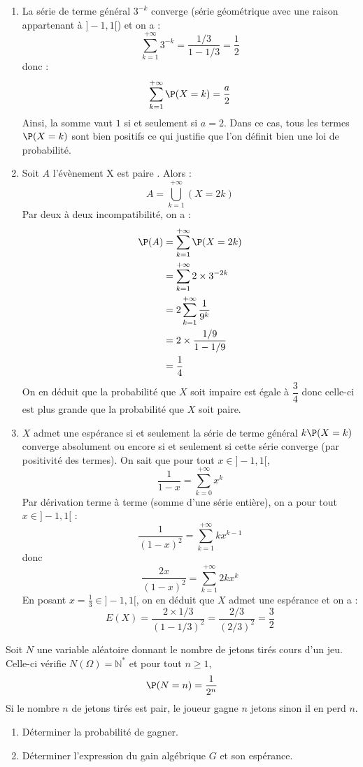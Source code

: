 \documentclass[a4paper,10pt]{report}
\begin{document}
\corr 

\begin{enumerate}
\item La série de terme général $3^{-k}$ converge (série géométrique avec une raison appartenant à $]-1,1[$) et on a :
$$ \sum_{k=1}^{+ \infty} 3^{-k} = \dfrac{1/3}{1-1/3}= \dfrac{1}{2}$$
donc :
$$ \sum_{k=1}^{+ \infty} \P(X=k) = \dfrac{a}{2}$$
Ainsi, la somme vaut $1$ si et seulement si $a=2$. Dans ce cas, tous les termes $\P(X=k)$ sont bien positifs ce qui justifie que l'on définit bien une loi de probabilité.
\item Soit $A$ l'évènement \og X est paire \fg. Alors :
$$ A = \bigcup_{k=1}^{+ \infty} (X=2k)$$
Par deux à deux incompatibilité, on a :
\begin{align*}
 \P(A) & = \sum_{k=1}^{+ \infty} \P(X=2k) \\
 & = \sum_{k=1}^{+ \infty} 2 \times 3^{-2k} \\
 & = 2 \sum_{k=1}^{+ \infty} \dfrac{1}{9^k} \\
 & = 2 \times \dfrac{1/9}{1-1/9} \\
 & = \dfrac{1}{4} 
 \end{align*}
On en déduit que la probabilité que $X$ soit impaire est égale à $\dfrac{3}{4}$ donc celle-ci est plus grande que la probabilité que $X$ soit paire.
\item $X$ admet une espérance si et seulement la série de terme général $k\P(X=k)$ converge absolument ou encore si et seulement si cette série converge (par positivité des termes). On sait que pour tout $x \in ]-1,1[$,
$$ \dfrac{1}{1-x} = \sum_{k=0}^{+ \infty} x^k$$
Par dérivation terme à terme (somme d'une série entière), on a pour tout $x \in ]-1,1[$ :
$$ \dfrac{1}{(1-x)^2} = \sum_{k=1}^{+ \infty} k x^{k-1}$$
donc
$$ \dfrac{2x}{(1-x)^2} = \sum_{k=1}^{+ \infty} 2k x^{k}$$
En posant $x= \tfrac{1}{3} \in  ]-1,1[$, on en déduit que $X$ admet une espérance et on a :
$$ E(X) = \dfrac{2 \times 1/3}{(1-1/3)^2} = \dfrac{2/3}{(2/3)^2}= \dfrac{3}{2}$$
\end{enumerate}




\begin{Exa} Soit $N$ une variable aléatoire donnant le nombre de jetons tirés cours d'un jeu. Celle-ci vérifie $N(\Omega)= \mathbb{N}^*$ et pour tout $n \geq 1$,
$$ \P(N=n) = \dfrac{1}{2^n}$$
Si le nombre $n$ de jetons tirés est pair, le joueur gagne $n$ jetons sinon il en perd $n$.
\begin{enumerate}
\item Déterminer la probabilité de gagner.
\item Déterminer l'expression du gain algébrique $G$ et son espérance.
\end{enumerate}
\end{Exa}
\end{document}
